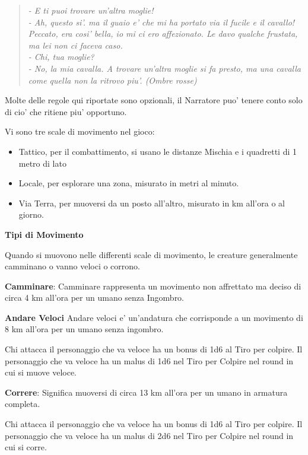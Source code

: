 \documentclass[a4paper,11pt,twoside,openany]{book}
\begin{document}
{		\begin{quote}\textit{
				- E ti puoi trovare un'altra moglie!\\
				- Ah, questo si'. ma il guaio e' che mi ha portato via il fucile e il cavallo! Peccato, era cosi' bella, io mi ci ero affezionato. Le davo qualche frustata, ma lei non ci faceva caso.\\
				- Chi, tua moglie?\\
				- No, la mia cavalla. A trovare un'altra moglie si fa presto, ma una cavalla come quella non la ritrovo piu'. (Ombre rosse)
		}\end{quote}
		
		
		Molte delle regole qui riportate sono opzionali, il Narratore puo' tenere conto solo di cio' che ritiene piu' opportuno.
		
		Vi sono tre scale di movimento nel gioco:
		\begin{itemize}
			\item Tattico, per il combattimento, si usano le distanze Mischia e i quadretti
			di 1 metro di lato 
			\item Locale, per esplorare una zona, misurato in metri al minuto. 
			\item Via Terra, per muoversi da un posto all'altro, misurato in km all'ora o al giorno. 
		\end{itemize}
		\textbf{Tipi di Movimento}
		
		Quando si muovono nelle differenti scale di movimento, le creature generalmente camminano o vanno veloci o corrono.
		
		\textbf{Camminare}: Camminare rappresenta un movimento non affrettato ma deciso di circa 4 km all'ora per un umano senza Ingombro.
		
		\textbf{Andare Veloci} Andare veloci e' un'andatura che corrisponde a un movimento di 8 km all'ora per un umano senza ingombro.
		
		Chi attacca il personaggio che va veloce ha un bonus di 1d6 al Tiro per colpire. Il personaggio che va veloce ha un malus di 1d6 nel Tiro per Colpire nel round in cui si muove veloce.
		
		\textbf{Correre}: Significa muoversi di circa 13 km all'ora per un
		umano in armatura completa.
		
		Chi attacca il personaggio che va veloce ha un bonus di 1d6 al Tiro per colpire. Il personaggio che va veloce ha un malus di 2d6 nel Tiro per Colpire nel round in cui si corre.
		
}
\end{document}

